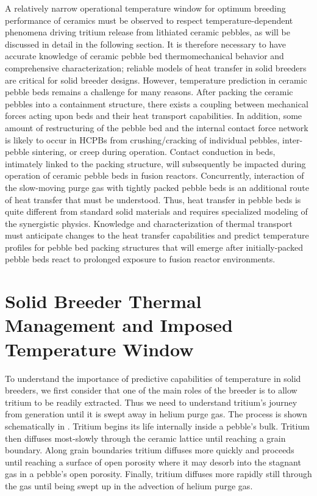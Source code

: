 \documentclass[11pt]{report} %
\begin{document}
A relatively narrow operational temperature window for optimum breeding performance of ceramics must be observed to respect temperature-dependent phenomena driving tritium release from lithiated ceramic pebbles, as will be discussed in detail in the following section. It is therefore necessary to have accurate knowledge of ceramic pebble bed thermomechanical behavior and comprehensive characterization; reliable models of heat transfer in solid breeders are critical for solid breeder designs. However, temperature prediction in ceramic pebble beds remains a challenge for many reasons. After packing the ceramic pebbles into a containment structure, there exists a coupling between mechanical forces acting upon beds and their heat transport capabilities. In addition, some amount of restructuring of the pebble bed and the internal contact force network is likely to occur in HCPBs from crushing/cracking of individual pebbles, inter-pebble sintering, or creep during operation. Contact conduction in beds, intimately linked to the packing structure, will subsequently be impacted during operation of ceramic pebble beds in fusion reactors. Concurrently, interaction of the slow-moving purge gas with tightly packed pebble beds is an additional route of heat transfer that must be understood. Thus, heat transfer in pebble beds is quite different from standard solid materials and requires specialized modeling of the synergistic physics. Knowledge and characterization of thermal transport must anticipate changes to the heat transfer capabilities and predict temperature profiles for pebble bed packing structures that will emerge after initially-packed pebble beds react to prolonged exposure to fusion reactor environments.

\section{Solid Breeder Thermal Management and Imposed Temperature Window}

To understand the importance of predictive capabilities of temperature in solid breeders, we first consider that one of the main roles of the breeder is to allow tritium to be readily extracted. Thus we need to understand tritium's journey from generation until it is swept away in helium purge gas. The process is shown schematically in . Tritium begins its life internally inside a pebble's bulk. Tritium then diffuses most-slowly through the ceramic lattice until reaching a grain boundary. Along grain boundaries tritium diffuses more quickly and proceeds until reaching a surface of open porosity where it may desorb into the stagnant gas in a pebble's open porosity. Finally, tritium diffuses more rapidly still through the gas until being swept up in the advection of helium purge gas.\cite{Federici1990} 
\end{document}
